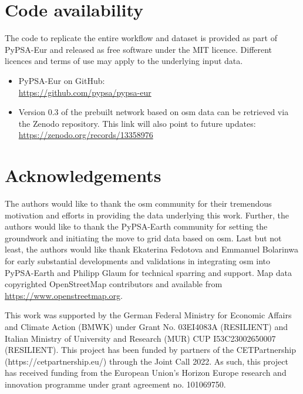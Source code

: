 \documentclass[fleqn,10pt]{wlscirep}
\let\autocite\cite
\begin{document}
\section*{Code availability}
The code to replicate the entire workflow and dataset is provided as part of PyPSA-Eur and released as free software under the MIT licence. Different licences and terms of use may apply to the underlying input data.
\begin{itemize}
    \item PyPSA-Eur \autocite{horschPyPSAEurOpenOptimisation2018} on GitHub: \\ \href{https://github.com/pypsa/pypsa-eur}{https://github.com/pypsa/pypsa-eur}
    \item Version 0.3 of the prebuilt network\autocite{xiongPrebuiltElectricityNetwork2024} based on \acrshort{osm} data can be retrieved via the Zenodo repository. This link will also point to future updates: \\ \href{https://zenodo.org/records/13358976}{https://zenodo.org/records/13358976}
\end{itemize}



\section*{Acknowledgements} %
The authors would like to thank the \gls{osm} community for their tremendous motivation and efforts in providing the data underlying this work. Further, the authors would like to thank the PyPSA-Earth community for setting the groundwork and initiating the move to grid data based on \gls{osm}. Last but not least, the authors would like thank Ekaterina Fedotova and Emmanuel Bolarinwa for early substantial developments and validations in integrating \acrshort{osm} into PyPSA-Earth and Philipp Glaum for technical sparring and support. Map data copyrighted OpenStreetMap contributors and available from \href{https://www.openstreetmap.org}{https://www.openstreetmap.org}. 

This work was supported by the German Federal Ministry for Economic Affairs and Climate Action (BMWK) under Grant No. 03EI4083A (RESILIENT) and Italian Ministry of University and Research (MUR) CUP I53C23002650007 (RESILIENT). This project has been funded by partners of the CETPartnership (https://cetpartnership.eu/) through the Joint Call 2022. As such, this project has received funding from the European Union's Horizon Europe research and innovation programme under grant agreement no. 101069750.
\end{document}
